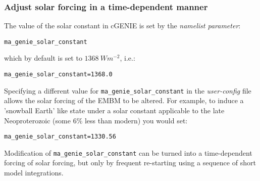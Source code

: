 %
\newpage
\subsubsection{Adjust solar forcing in a time-dependent manner}
\vspace{1mm}

\vspace{1mm}
The value of the solar constant in cGENIE is set by the \textit{namelist parameter}:
\vspace{-2pt}\begin{verbatim}
ma_genie_solar_constant
\end{verbatim}\vspace{-2pt}
which by default is set to \(1368\:W m^{-2}\), i.e.:
\vspace{-2pt}\begin{verbatim}
ma_genie_solar_constant=1368.0
\end{verbatim}\vspace{-2pt}

Specifying a different value for \texttt{ma\_genie\_solar\_constant} in the \textit{user-config} file allows the solar forcing of the EMBM to be altered. For example, to induce a 'snowball Earth' like state under a solar constant applicable to the late Neoproterozoic (some 6\% less than modern) you would set:
\vspace{-2pt}\begin{verbatim}
ma_genie_solar_constant=1330.56
\end{verbatim}\vspace{-2pt}

Modification of \texttt{ma\_genie\_solar\_constant} can be turned into a time-dependent forcing of solar forcing, but only by frequent re-starting using a sequence of short model integrations.

